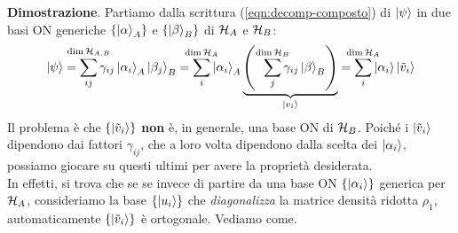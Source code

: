 \documentclass[../../InformazioneQuantistica.tex]{subfiles}
\begin{document}
\textbf{Dimostrazione}.
Partiamo dalla scrittura (\ref{eqn:decomp-composto}) di $\Ket{\psi}$ in due basi ON generiche $\{\Ket{\alpha}_A\}$ e $\{\Ket{\beta}_B\}$ di $\mathcal{H}_A$ e $\mathcal{H}_B$:
\begin{align}
\ket{\psi} = \smashoperator{\sum_{ij}^{\op{dim}\hs_{A,B}}} \gamma_{ij}\ket{\alpha_i}_A\ket{\beta_j}_B = \smashoperator{\sum_i^{\op{dim}\hs_A}} \ket{\alpha_i}_A \underbrace{\left( \smashoperator[r]{\sum_{j}^{\op{dim}\hs_B}} \gamma_{ij} \ket{\beta}_B\right)}_{\ket{v_i}} = \smashoperator{\sum_i^{\op{dim}\hs_A}} \ket{\alpha_i}\ket{\tilde{v}_i}
\label{eqn:passo-decomp}
\end{align}
Il problema è che $\{\Ket{\tilde{v}_i}\}$ \textbf{non} è, in generale, una base ON di $\mathcal{H}_B$. Poiché i $\Ket{\tilde{v}_i}$ dipendono dai fattori $\gamma_{ij}$, che a loro volta dipendono dalla scelta dei $\Ket{\alpha_i}$, possiamo giocare su questi ultimi per avere la proprietà desiderata.\\
In effetti, si trova che se se invece di partire da una base ON $\{\Ket{\alpha_i}\}$ generica per $\mathcal{H}_A$, consideriamo la base $\{\Ket{u_i}\}$ che \textit{diagonalizza} la matrice densità ridotta $\rho_1$, automaticamente $\{\Ket{\tilde{v}_i}\}$ è ortogonale. Vediamo come.\\
\end{document}
